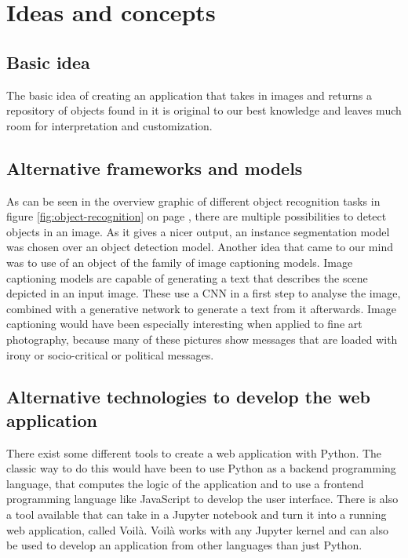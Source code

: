 \chapter{Ideas and concepts}

\section{Basic idea}

The basic idea of creating an application that takes in images and returns a repository of objects found in it is original to our best knowledge and leaves much room for interpretation and customization.

\section{Alternative frameworks and models}

As can be seen in the overview graphic of different object recognition tasks in figure \ref{fig:object-recognition} on page \pageref{fig:object-recognition}, there are multiple possibilities to detect objects in an image. As it gives a nicer output, an instance segmentation model was chosen over an object detection model. Another idea that came to our mind was to use of an object of the family of image captioning models. Image captioning models are capable of generating a text that describes the scene depicted in an input image. These use a CNN in a first step to analyse the image, combined with a generative network to generate a text from it afterwards. Image captioning would have been especially interesting when applied to fine art photography, because many of these pictures show messages that are loaded with irony or socio-critical or political messages.

\section{Alternative technologies to develop the web application}

There exist some different tools to create a web application with Python. The classic way to do this would have been to use Python as a backend programming language, that computes the logic of the application and to use a frontend programming language like JavaScript to develop the user interface. There is also a tool available that can take in a Jupyter notebook and turn it into a running web application, called Voilà. Voilà works with any Jupyter kernel and can also be used to develop an application from other languages than just Python.

